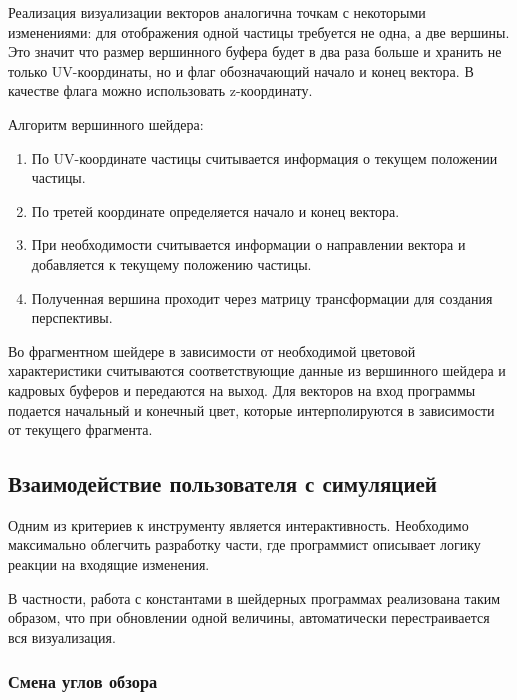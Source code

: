 Реализация визуализации векторов аналогична точкам с некоторыми изменениями: для отображения
одной частицы требуется не одна, а две вершины. Это значит что размер вершинного буфера
будет в два раза больше и хранить не только UV-координаты, но и флаг обозначающий начало
и конец вектора. В качестве флага можно использовать z-координату.

Алгоритм вершинного шейдера:

\begin{enumerate}
  \item По UV-координате частицы считывается информация о текущем положении частицы.
  \item По третей координате определяется начало и конец вектора.
  \item При необходимости считывается информации о направлении вектора и добавляется к
    текущему положению частицы.
  \item Полученная вершина проходит через матрицу трансформации для создания перспективы.
\end{enumerate}

Во фрагментном шейдере в зависимости от необходимой цветовой характеристики считываются
соответствующие данные из вершинного шейдера и кадровых буферов и передаются на выход.
Для векторов на вход программы подается начальный и конечный цвет, которые
интерполируются в зависимости от текущего фрагмента.


\subsection{Взаимодействие пользователя с симуляцией}

Одним из критериев к инструменту является интерактивность.
Необходимо максимально облегчить разработку части, где программист описывает логику 
реакции на входящие изменения.

В частности, работа с константами в шейдерных программах реализована
таким образом, что при обновлении одной величины, автоматически перестраивается
вся визуализация.

\subsubsection{Смена углов обзора}

